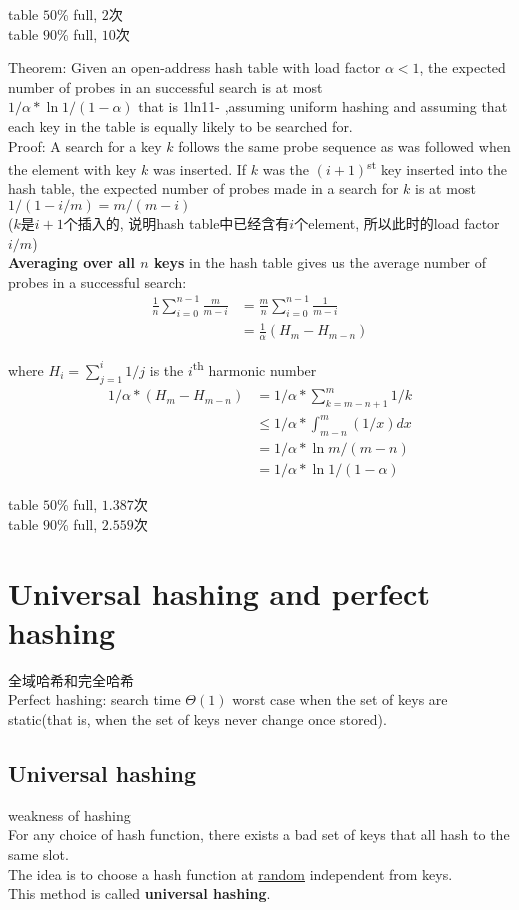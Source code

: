 \documentclass{article}
\begin{document}
\noindent table $50$\% full, $2$次\\
table $90$\% full, $10$次

Theorem: Given an open-address hash table with load factor $\alpha < 1$, the expected number of probes in an successful search is at most \\
$1/\alpha * \ln 1/(1-\alpha)$ that is 1ln11-  ,assuming uniform hashing and assuming that each key in the table is equally likely to be searched for.\\
Proof: A search for a key $k$ follows the same probe sequence as was followed when the element with key $k$ was inserted. If $k$ was the $(i+1)$\textsuperscript{st} key inserted into the hash table, the expected number of probes made in a search for $k$ is at most $1/(1 -  i/m)=m/(m - i)$\\
($k$是$i+1$个插入的, 说明hash table中已经含有$i$个element, 所以此时的load factor $i/m$)\\
\textbf{Averaging over all $n$ keys} in the hash table gives us the average number of probes in a successful search:
$$
\begin{aligned}
\frac{1}{n} \sum_{i=0}^{n-1}\frac{m}{m-i}
&= \frac{ m}{n} \sum_{i=0}^{n-1}\frac{1}{m-i}\\
&= \frac{1}{\alpha}(H_m - H_{m-n})
\end{aligned}
$$

where $H_i=\sum_{j=1}^i 1/j$ is the $i$\textsuperscript{th} harmonic number
$$
\begin{aligned}
1/\alpha * (H_m - H_{m-n})
&= 1/\alpha * \sum_{k=m-n+1}^m 1/k\\
&\leq 1/\alpha * \int_{m-n}^m (1/x)dx\\
&=1/\alpha * \ln m/(m-n)\\
&=1/\alpha * \ln 1/(1 - \alpha)
\end{aligned}
$$

\noindent table $50$\% full, $1.387$次\\
table $90$\% full, $2.559$次

\section{Universal hashing and perfect hashing}
全域哈希和完全哈希\\
Perfect hashing: search time $\Theta(1)$ worst case when the set of keys are static(that is, when the set of keys never change once stored).

\subsection{Universal hashing}
weakness of hashing\\
For any choice of hash function, there exists a bad set of keys that all hash to the same slot.\\
The idea is to choose a hash function at \underline{random} independent from keys.\\
This method is called \textbf{universal hashing}.
\end{document}
